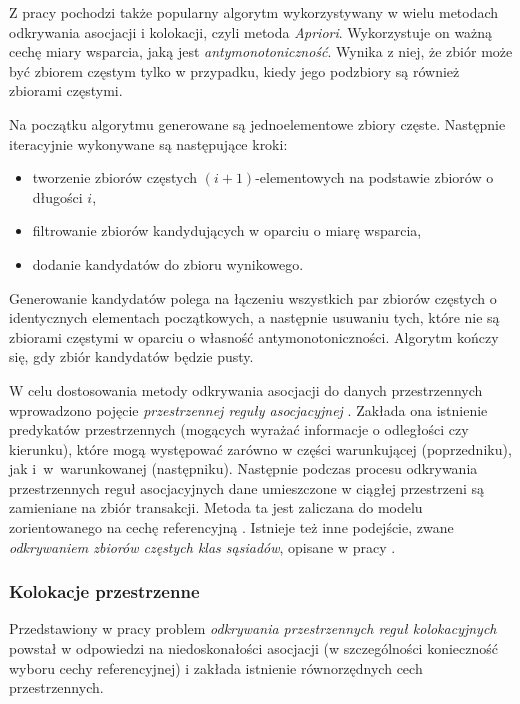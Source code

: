 \documentclass[12pt]{article}
\begin{document}
Z pracy \cite{asoc} pochodzi także popularny algorytm wykorzystywany w wielu metodach odkrywania asocjacji i kolokacji, czyli metoda \textit{Apriori}. Wykorzystuje on ważną cechę miary wsparcia, jaką jest \textit{antymonotoniczność}. Wynika z niej, że zbiór może być zbiorem częstym tylko w przypadku, kiedy jego podzbiory są również zbiorami częstymi. 

Na początku algorytmu generowane są jednoelementowe zbiory częste. Następnie iteracyjnie wykonywane są następujące kroki:
\begin{itemize}
\item tworzenie zbiorów częstych $ (i + 1) $-elementowych na podstawie zbiorów o długości $ i $,
\item filtrowanie zbiorów kandydujących w oparciu o miarę wsparcia,
\item dodanie kandydatów do zbioru wynikowego.
\end{itemize}

Generowanie kandydatów polega na łączeniu wszystkich par zbiorów częstych o identycznych elementach początkowych, a następnie usuwaniu tych, które nie są zbiorami częstymi w oparciu o własność antymonotoniczności. Algorytm kończy się, gdy zbiór kandydatów będzie pusty.  

W celu dostosowania metody odkrywania asocjacji do danych przestrzennych wprowadzono pojęcie \textit{przestrzennej reguły asocjacyjnej} \cite{asoc2}. Zakłada ona istnienie predykatów przestrzennych (mogących wyrażać informacje o odległości czy kierunku), które mogą występować zarówno w części warunkującej (poprzedniku), jak i~w~warunkowanej (następniku). Następnie podczas procesu odkrywania przestrzennych reguł asocjacyjnych dane umieszczone w ciągłej przestrzeni są zamieniane na zbiór transakcji. Metoda ta jest zaliczana do modelu zorientowanego na cechę referencyjną \cite{boinski}. Istnieje też inne podejście, zwane \textit{odkrywaniem zbiorów częstych klas sąsiadów}, opisane w pracy \cite{classsets}. 

\subsubsection{Kolokacje przestrzenne}

Przedstawiony w pracy \cite{huang} problem \textit{odkrywania przestrzennych reguł kolokacyjnych} powstał w odpowiedzi na niedoskonałości asocjacji (w szczególności konieczność wyboru cechy referencyjnej) i zakłada istnienie równorzędnych cech przestrzennych. 
\end{document}
